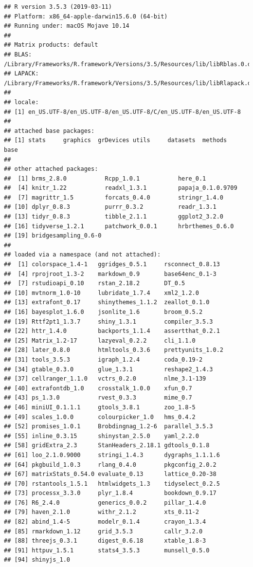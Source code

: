 \documentclass[floatsintext,doc]{apa6}
\begin{document}
\begin{verbatim}
## R version 3.5.3 (2019-03-11)
## Platform: x86_64-apple-darwin15.6.0 (64-bit)
## Running under: macOS Mojave 10.14
## 
## Matrix products: default
## BLAS: /Library/Frameworks/R.framework/Versions/3.5/Resources/lib/libRblas.0.dylib
## LAPACK: /Library/Frameworks/R.framework/Versions/3.5/Resources/lib/libRlapack.dylib
## 
## locale:
## [1] en_US.UTF-8/en_US.UTF-8/en_US.UTF-8/C/en_US.UTF-8/en_US.UTF-8
## 
## attached base packages:
## [1] stats     graphics  grDevices utils     datasets  methods   base     
## 
## other attached packages:
##  [1] brms_2.8.0           Rcpp_1.0.1           here_0.1            
##  [4] knitr_1.22           readxl_1.3.1         papaja_0.1.0.9709   
##  [7] magrittr_1.5         forcats_0.4.0        stringr_1.4.0       
## [10] dplyr_0.8.3          purrr_0.3.2          readr_1.3.1         
## [13] tidyr_0.8.3          tibble_2.1.1         ggplot2_3.2.0       
## [16] tidyverse_1.2.1      patchwork_0.0.1      hrbrthemes_0.6.0    
## [19] bridgesampling_0.6-0
## 
## loaded via a namespace (and not attached):
##  [1] colorspace_1.4-1   ggridges_0.5.1     rsconnect_0.8.13  
##  [4] rprojroot_1.3-2    markdown_0.9       base64enc_0.1-3   
##  [7] rstudioapi_0.10    rstan_2.18.2       DT_0.5            
## [10] mvtnorm_1.0-10     lubridate_1.7.4    xml2_1.2.0        
## [13] extrafont_0.17     shinythemes_1.1.2  zeallot_0.1.0     
## [16] bayesplot_1.6.0    jsonlite_1.6       broom_0.5.2       
## [19] Rttf2pt1_1.3.7     shiny_1.3.1        compiler_3.5.3    
## [22] httr_1.4.0         backports_1.1.4    assertthat_0.2.1  
## [25] Matrix_1.2-17      lazyeval_0.2.2     cli_1.1.0         
## [28] later_0.8.0        htmltools_0.3.6    prettyunits_1.0.2 
## [31] tools_3.5.3        igraph_1.2.4       coda_0.19-2       
## [34] gtable_0.3.0       glue_1.3.1         reshape2_1.4.3    
## [37] cellranger_1.1.0   vctrs_0.2.0        nlme_3.1-139      
## [40] extrafontdb_1.0    crosstalk_1.0.0    xfun_0.7          
## [43] ps_1.3.0           rvest_0.3.3        mime_0.7          
## [46] miniUI_0.1.1.1     gtools_3.8.1       zoo_1.8-5         
## [49] scales_1.0.0       colourpicker_1.0   hms_0.4.2         
## [52] promises_1.0.1     Brobdingnag_1.2-6  parallel_3.5.3    
## [55] inline_0.3.15      shinystan_2.5.0    yaml_2.2.0        
## [58] gridExtra_2.3      StanHeaders_2.18.1 gdtools_0.1.8     
## [61] loo_2.1.0.9000     stringi_1.4.3      dygraphs_1.1.1.6  
## [64] pkgbuild_1.0.3     rlang_0.4.0        pkgconfig_2.0.2   
## [67] matrixStats_0.54.0 evaluate_0.13      lattice_0.20-38   
## [70] rstantools_1.5.1   htmlwidgets_1.3    tidyselect_0.2.5  
## [73] processx_3.3.0     plyr_1.8.4         bookdown_0.9.17   
## [76] R6_2.4.0           generics_0.0.2     pillar_1.4.0      
## [79] haven_2.1.0        withr_2.1.2        xts_0.11-2        
## [82] abind_1.4-5        modelr_0.1.4       crayon_1.3.4      
## [85] rmarkdown_1.12     grid_3.5.3         callr_3.2.0       
## [88] threejs_0.3.1      digest_0.6.18      xtable_1.8-3      
## [91] httpuv_1.5.1       stats4_3.5.3       munsell_0.5.0     
## [94] shinyjs_1.0
\end{verbatim}
\end{document}
